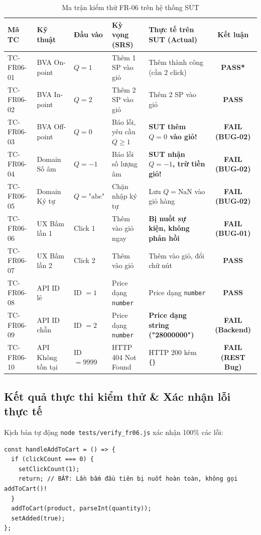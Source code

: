 \documentclass[11pt,a4paper]{article}
\begin{document}
\begin{table}[h]
\centering
\footnotesize
\begin{tabularx}{\textwidth}{l L{2.2cm} L{1.8cm} L{3cm} Y c}
\toprule
\textbf{Mã TC} & \textbf{Kỹ thuật} & \textbf{Đầu vào} & \textbf{Kỳ vọng (SRS)} & \textbf{Thực tế trên SUT (Actual)} & \textbf{Kết luận} \\
\midrule
TC-FR06-01 & BVA On-point & $Q = 1$ & Thêm 1 SP vào giỏ & Thêm thành công (cần 2 click) & \textbf{PASS*} \\
TC-FR06-02 & BVA In-point & $Q = 2$ & Thêm 2 SP vào giỏ & Thêm 2 SP vào giỏ & \textbf{PASS} \\
TC-FR06-03 & BVA Off-point & $Q = 0$ & Báo lỗi, yêu cầu $Q \ge 1$ & \textbf{SUT thêm $Q=0$ vào giỏ!} & \textbf{\color{darkred}FAIL (BUG-02)} \\
TC-FR06-04 & Domain Số âm & $Q = -1$ & Báo lỗi số lượng âm & \textbf{SUT nhận $Q=-1$, trừ tiền giỏ!} & \textbf{\color{darkred}FAIL (BUG-02)} \\
TC-FR06-05 & Domain Ký tự & $Q = \text{"abc"}$ & Chặn nhập ký tự & Lưu $Q=\text{NaN}$ vào giỏ hàng & \textbf{\color{darkred}FAIL (BUG-02)} \\
TC-FR06-06 & UX Bấm lần 1 & Click 1 & Thêm vào giỏ ngay & \textbf{Bị nuốt sự kiện, không phản hồi} & \textbf{\color{darkred}FAIL (BUG-01)} \\
TC-FR06-07 & UX Bấm lần 2 & Click 2 & Thêm vào giỏ & Thêm vào giỏ, đổi chữ nút & \textbf{PASS} \\
TC-FR06-08 & API ID lẻ & ID $= 1$ & Price dạng \texttt{number} & Price dạng \texttt{number} & \textbf{PASS} \\
TC-FR06-09 & API ID chẵn & ID $= 2$ & Price dạng \texttt{number} & \textbf{Price dạng string ("28000000")} & \textbf{\color{darkred}FAIL (Backend)} \\
TC-FR06-10 & API Không tồn tại & ID $= 9999$ & HTTP 404 Not Found & HTTP 200 kèm \texttt{\{\}} & \textbf{\color{darkred}FAIL (REST Bug)} \\
\bottomrule
\end{tabularx}
\caption{Ma trận kiểm thử FR-06 trên hệ thống SUT}
\end{table}

\subsection{Kết quả thực thi kiểm thử \& Xác nhận lỗi thực tế}
Kịch bản tự động \texttt{node tests/verify\_fr06.js} xác nhận 100\% các lỗi:
\begin{lstlisting}[caption={Đoạn mã bẫy sự kiện click tại ProductDetail.jsx:21-25}]
const handleAddToCart = () => {
  if (clickCount === 0) {
    setClickCount(1);
    return; // BẪY: Lần bấm đầu tiên bị nuốt hoàn toàn, không gọi addToCart()!
  }
  addToCart(product, parseInt(quantity));
  setAdded(true);
};
\end{lstlisting}
\end{document}
